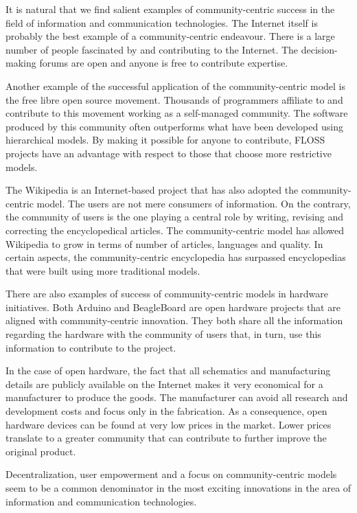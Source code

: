 \documentclass[journal]{IEEEtran}
\begin{document}
It is natural that we find salient examples of community-centric success in the field of information and communication technologies.
The Internet itself is probably the best example of a community-centric endeavour.
There is a large number of people fascinated by and contributing to the Internet.
The decision-making forums are open and anyone is free to contribute expertise.

Another example of the successful application of the community-centric model is the free libre open source movement.
Thousands of programmers affiliate to and contribute to this movement working as a self-managed community.
The software produced by this community often outperforms what have been developed using hierarchical models.
By making it possible for anyone to contribute, FLOSS projects have an advantage with respect to those that choose more restrictive models.

The Wikipedia is an Internet-based project that has also adopted the community-centric model.
The users are not mere consumers of information. 
On the contrary, the community of users is the one playing a central role by writing, revising and correcting the encyclopedical articles.
The community-centric model has allowed Wikipedia to grow in terms of number of articles, languages and quality.
In certain aspects, the community-centric encyclopedia has surpassed encyclopedias that were built using more traditional models.

There are also examples of success of community-centric models in hardware initiatives.
Both Arduino and BeagleBoard are open hardware projects that are aligned with community-centric innovation.
They both share all the information regarding the hardware with the community of users that, in turn, use this information to contribute to the project.

In the case of open hardware, the fact that all schematics and manufacturing details are publicly available on the Internet makes it very economical for a manufacturer to produce the goods.
The manufacturer can avoid all research and development costs and focus only in the fabrication.
As a consequence, open hardware devices can be found at very low prices in the market.
Lower prices translate to a greater community that can contribute to further improve the original product.

Decentralization, user empowerment and a focus on community-centric models seem to be a common denominator in the most exciting innovations in the area of information and communication technologies.
\end{document}
